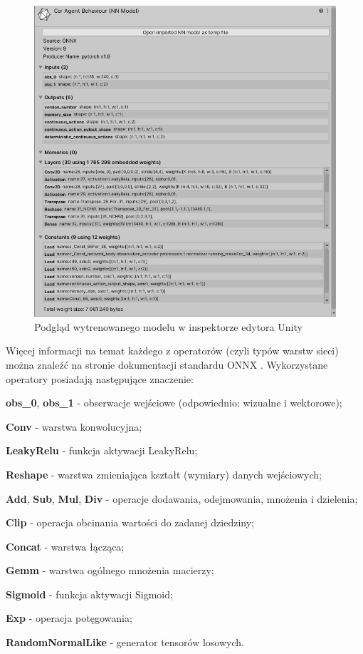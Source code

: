 \begin{figure}[h]
\begin{center}
\includegraphics[width=13.5cm]{resources/figures/trained_model_inspector.png}
\caption{Podgląd wytrenowanego modelu w inspektorze edytora Unity}
\label{TrainedModelInspector}
\end{center}
\vspace*{-0.5cm}
\end{figure}

Więcej informacji na temat każdego z operatorów (czyli typów warstw sieci) można znaleźć na stronie dokumentacji standardu ONNX \cite{onnx:operators}. Wykorzystane operatory posiadają następujące znaczenie:
\vspace*{-0.5cm}
\begin{enumerate*}
\item \textbf{obs\_0}, \textbf{obs\_1} - obserwacje wejściowe (odpowiednio: wizualne i wektorowe);
\item \textbf{Conv} - warstwa konwolucyjna;
\item \textbf{LeakyRelu} - funkcja aktywacji LeakyRelu;
\item \textbf{Reshape} - warstwa zmieniająca kształt (wymiary) danych wejściowych;
\item \textbf{Add}, \textbf{Sub}, \textbf{Mul}, \textbf{Div} - operacje dodawania, odejmowania, mnożenia i dzielenia;
\item \textbf{Clip} - operacja obcinania wartości do zadanej dziedziny;
\item \textbf{Concat} - warstwa łącząca;
\item \textbf{Gemm} - warstwa ogólnego mnożenia macierzy;
\item \textbf{Sigmoid} - funkcja aktywacji Sigmoid;
\item \textbf{Exp} - operacja potęgowania;
\item \textbf{RandomNormalLike} - generator tensorów losowych.
\end{enumerate*}

